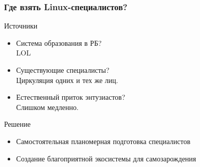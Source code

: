 \begin{frame}
	\frametitle{Где взять Linux-специалистов?}

	\begin{block}{Источники}
		\begin{itemize}
			\item Система образования в РБ? \\
				LOL
				\pause
			\item Существующие специалисты? \\
				Циркуляция одних и тех же лиц.
				\pause
			\item Естественный приток энтузиастов? \\
				Слишком медленно.
		\end{itemize}
	\end{block}

	\begin{block}{Решение}
		\begin{itemize}
			\item Самостоятельная планомерная подготовка специалистов
			\item Создание благоприятной экосистемы для самозарождения
		\end{itemize}

	\end{block}
\end{frame}

